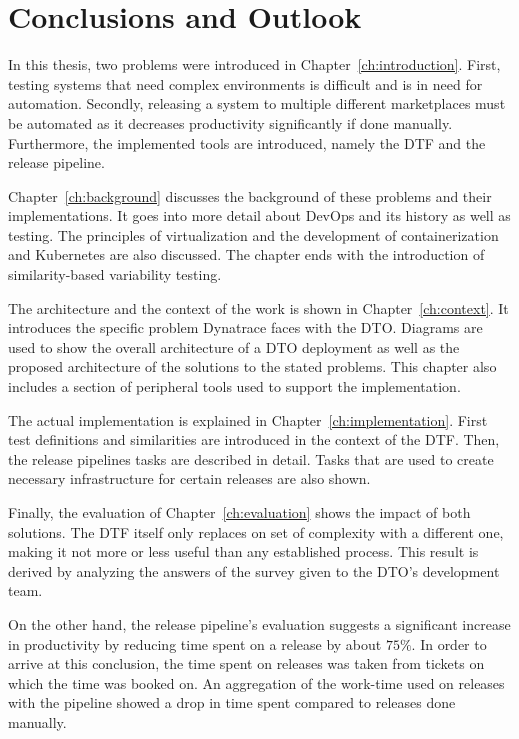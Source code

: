 \chapter{Conclusions and Outlook}\label{ch:conclusions-and-outlook}

In this thesis, two problems were introduced in Chapter~\ref{ch:introduction}.
First, testing systems that need complex environments is difficult and is in need for automation.
Secondly, releasing a system to multiple different marketplaces must be automated as it decreases productivity significantly if done manually.
Furthermore, the implemented tools are introduced, namely the DTF and the release pipeline.

Chapter~\ref{ch:background} discusses the background of these problems and their implementations.
It goes into more detail about DevOps and its history as well as testing.
The principles of virtualization and the development of containerization and Kubernetes are also discussed.
The chapter ends with the introduction of similarity-based variability testing.

The architecture and the context of the work is shown in Chapter~\ref{ch:context}.
It introduces the specific problem Dynatrace faces with the DTO.
Diagrams are used to show the overall architecture of a DTO deployment as well as the proposed architecture of the solutions to the stated problems.
This chapter also includes a section of peripheral tools used to support the implementation.

The actual implementation is explained in Chapter~\ref{ch:implementation}.
First test definitions and similarities are introduced in the context of the DTF.
Then, the release pipelines tasks are described in detail.
Tasks that are used to create necessary infrastructure for certain releases are also shown.

Finally, the evaluation of Chapter~\ref{ch:evaluation} shows the impact of both solutions.
The DTF itself only replaces on set of complexity with a different one, making it not more or less useful than any established process.
This result is derived by analyzing the answers of the survey given to the DTO's development team.

\pagebreak

On the other hand, the release pipeline's evaluation suggests a significant increase in productivity by reducing time spent on a release by about $75 \%$.
In order to arrive at this conclusion, the time spent on releases was taken from tickets on which the time was booked on.
An aggregation of the work-time used on releases with the pipeline showed a drop in time spent compared to releases done manually.

